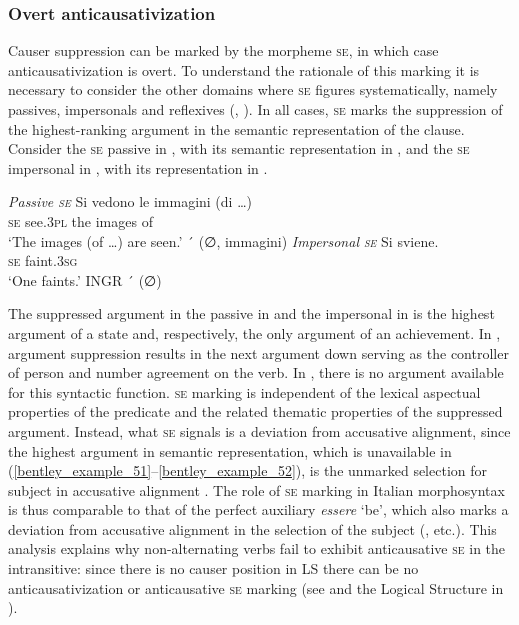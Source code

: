 \documentclass[output=paper,colorlinks,citecolor=brown
]{langscibook}
\begin{document}
\subsubsection{Overt anticausativization}
\label{bentley_section_5.4.1}
Causer suppression can be marked by the morpheme \textsc{se}, in which case anticausativization is overt. To understand the rationale of this marking it is necessary to consider the other domains where \textsc{se} figures systematically, namely passives, impersonals and reflexives (, ). In all cases, \textsc{se} marks the suppression of the highest-ranking argument in the semantic representation of the clause. Consider the \textsc{se} passive in , with its semantic representation in , and the \textsc{se} impersonal in , with its representation in .

\ea \label{bentley_example_51}
    \textit{Passive \textsc{se}}
    \ea \label{bentley_example_51a}
    \gll Si		vedono	le		immagini (di \ldots ) \\
    \textsc{se}		see.3\textsc{pl}		the	images		of \\
    \glt 	‘The images (of \ldots ) are seen.’
    \ex \label{bentley_example_51b}
    ´ (∅, immagini)
    \z
\ex \label{bentley_example_52}
    \textit{Impersonal \textsc{se}}
    \ea \label{bentley_example_52a}
    \gll Si 	sviene.\\
    \textsc{se}		faint.3\textsc{sg}	 \\
    \glt 	‘One faints.’
    \ex \label{bentley_example_52b}
    INGR ´ (∅)
    \z
\z

The suppressed argument in the passive in  and the impersonal in  is the highest argument of a state and, respectively, the only argument of an achievement. In , argument suppression results in the next argument down serving as the controller of person and number agreement on the verb. In , there is no argument available for this syntactic function. \textsc{se} marking is independent of the lexical aspectual properties of the predicate and the related thematic properties of the suppressed argument. Instead, what \textsc{se} signals is a deviation from accusative alignment, since the highest argument in semantic representation, which is unavailable in (\ref{bentley_example_51}--\ref{bentley_example_52}), is the unmarked selection for subject in accusative alignment \citep[175]{vanvalin1997syntax}. The role of \textsc{se} marking in Italian morphosyntax is thus comparable to that of the perfect auxiliary \textit{essere} ‘be’, which also marks a deviation from accusative alignment in the selection of the subject (\cite{lafauci1988oggetti,bentley2006split,ledgeway2012latin,loporcaro2016auxiliary}, etc.). This analysis explains why non-alternating verbs fail to exhibit anticausative \textsc{se} in the intransitive: since there is no causer position in LS there can be no anticausativization or anticausative \textsc{se} marking (see  and the Logical Structure in ).
\end{document}
